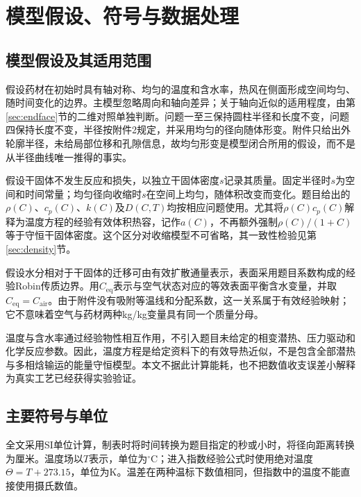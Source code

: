 \section{模型假设、符号与数据处理}
\subsection{模型假设及其适用范围}
假设药材在初始时具有轴对称、均匀的温度和含水率，热风在侧面形成空间均匀、随时间变化的边界。主模型忽略周向和轴向差异；关于轴向近似的适用程度，由第\ref{sec:endface}节的二维对照单独判断。问题一至三保持圆柱半径和长度不变，问题四保持长度不变，半径按附件2规定，并采用均匀的径向随体形变。附件只给出外轮廓半径，未给局部位移和孔隙信息，故均匀形变是模型闭合所用的假设，而不是从半径曲线唯一推得的事实。

假设干固体不发生反应和损失，以独立干固体密度$s$记录其质量。固定半径时$s$为空间和时间常量；均匀径向收缩时$s$在空间上均匀，随体积改变而变化。题目给出的$\rho(C)$、$c_p(C)$、$k(C)$及$D(C,T)$均按相应问题使用。尤其将$\rho(C)c_p(C)$解释为温度方程的经验有效体积热容，记作$a(C)$，不再额外强制$\rho(C)/(1+C)$等于守恒干固体密度。这个区分对收缩模型不可省略，其一致性检验见第\ref{sec:density}节。

假设水分相对于干固体的迁移可由有效扩散通量表示，表面采用题目系数构成的经验Robin传质边界。用$C_{\mathrm{eq}}$表示与空气状态对应的等效表面平衡含水变量，并取$C_{\mathrm{eq}}=C_{\mathrm{air}}$。由于附件没有吸附等温线和分配系数，这一关系属于有效经验映射；它不意味着空气与药材两种kg/kg变量具有同一个质量分母。

温度与含水率通过经验物性相互作用，不引入题目未给定的相变潜热、压力驱动和化学反应参数。因此，温度方程是给定资料下的有效导热近似，不是包含全部潜热与多相焓输运的能量守恒模型。本文不据此计算能耗，也不把数值收支误差小解释为真实工艺已经获得实验验证。

\subsection{主要符号与单位}
全文采用SI单位计算，制表时将时间转换为题目指定的秒或小时，将径向距离转换为厘米。温度场以$T$表示，单位为$^\circ$C；进入指数经验公式时使用绝对温度$\Theta=T+273.15$，单位为K。温差在两种温标下数值相同，但指数中的温度不能直接使用摄氏数值。

